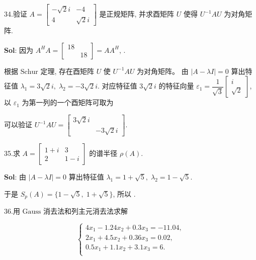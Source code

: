 
34.验证 $A=\begin{bmatrix}
    -\sqrt{2}i&-4\\
    4&\sqrt{2}i
\end{bmatrix}$ 是正规矩阵, 并求酉矩阵 $U$ 使得 $U^{-1}AU$ 为对角矩阵.


\textbf{Sol}:  因为 $A^HA=\begin{bmatrix}
    18&\\&18
\end{bmatrix}=AA^H$, 
.

根据 $\text{Schur}$ 定理, 存在酉矩阵 $U$ 使 $U^{-1}AU$ 为对角矩阵。 由 $|A-\lambda I|=0$ 算出特征值 $\lambda_1=3\sqrt{2}i,\;\lambda_2=-3\sqrt{2}i$. 对应特征值 $3\sqrt{2}i$ 的特征向量 $\varepsilon_1=\dfrac{1}{\sqrt{3}}\begin{bmatrix}
    i\\\sqrt{2}
\end{bmatrix}$, 以 $\varepsilon_1$ 为第一列的一个酉矩阵可取为 

可以验证 $U^{-1}AU=\begin{bmatrix}
    3\sqrt{2}i&\\&-3\sqrt{2}i
\end{bmatrix}$.


\vspace{12pt}

35.求 $A=\begin{bmatrix}
    1+i&3\\
    2&1-i
\end{bmatrix}$ 的谱半径 $\rho(A)$.


\textbf{Sol}: 由 $|A-\lambda I|=0$ 算出特征值 $\lambda_1=1+\sqrt{5},\;\lambda_2=1-\sqrt{5}$. 

于是 $S_p(A)=\{1-\sqrt{5},\;1+\sqrt{5}\}$, 所以 .


\vspace{12pt}

36.用 $\text{Gauss}$ 消去法和列主元消去法求解

$$
\begin{cases}
    4x_1-1.24x_2+0.3x_3=-11.04,\\
    2x_1+4.5x_2+0.36x_3=0.02,\\
    0.5x_1+1.1x_2+3.1x_3=6.\\
\end{cases}
$$


